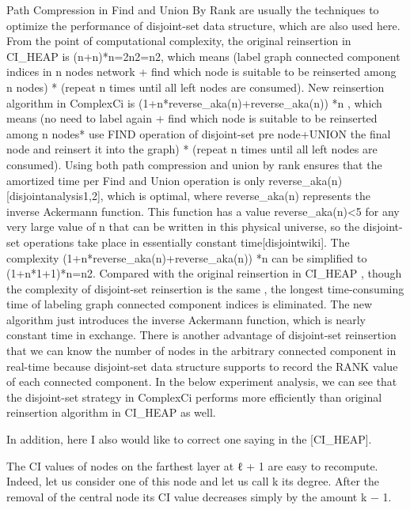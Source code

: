 \documentclass{article}
\begin{document}
\begin{enumerate}
\begin{item}
	
		Path Compression in Find and Union By Rank are usually the techniques to optimize the performance of disjoint-set data structure, which are also used here. 
		From the point of computational complexity, the original reinsertion in CI\_HEAP is (n+n)*n=2n2=n2, which means (label graph connected component indices in n nodes network + find which node is suitable to be reinserted among n nodes) * (repeat n times until all left nodes are consumed). New reinsertion algorithm in ComplexCi is (1+n*reverse\_aka(n)+reverse\_aka(n)) *n , which means (no need to label again + find which node is suitable to be reinserted among n nodes* use FIND operation of disjoint-set pre node+UNION the final node and reinsert it into the graph) * (repeat n times until all left nodes are consumed). Using both path compression and union by rank ensures that the amortized time per Find and Union operation is only reverse\_aka(n)[disjointanalysis1,2], which is optimal, where reverse\_aka(n) represents the inverse Ackermann function. This function has a value reverse\_aka(n)<5 for any very large value of n that can be written in this physical universe, so the disjoint-set operations take place in essentially constant time[disjointwiki]. The complexity (1+n*reverse\_aka(n)+reverse\_aka(n)) *n can be simplified to (1+n*1+1)*n=n2. Compared with the original reinsertion in CI\_HEAP , though the complexity of disjoint-set reinsertion is the same , the longest time-consuming time of labeling graph connected component indices is eliminated. The new algorithm just introduces the inverse Ackermann function, which is nearly constant time in exchange. There is another advantage of disjoint-set reinsertion that we can know the number of nodes in the arbitrary connected component in real-time because disjoint-set data structure supports to record the RANK value of each connected component. In the below experiment analysis, we can see that the disjoint-set strategy in ComplexCi performs more efficiently than original reinsertion algorithm in CI\_HEAP as well.


	\end{item}
	\end{enumerate}	

	

	
	In addition, here I also would like to correct one saying in the [CI\_HEAP]. 
	
	The CI values of nodes on the farthest layer at ℓ + 1 are easy to recompute. Indeed, let us consider one of this node and let us call k its degree. After the removal of the central node its CI value decreases simply by the amount k − 1.
	
\end{document}
